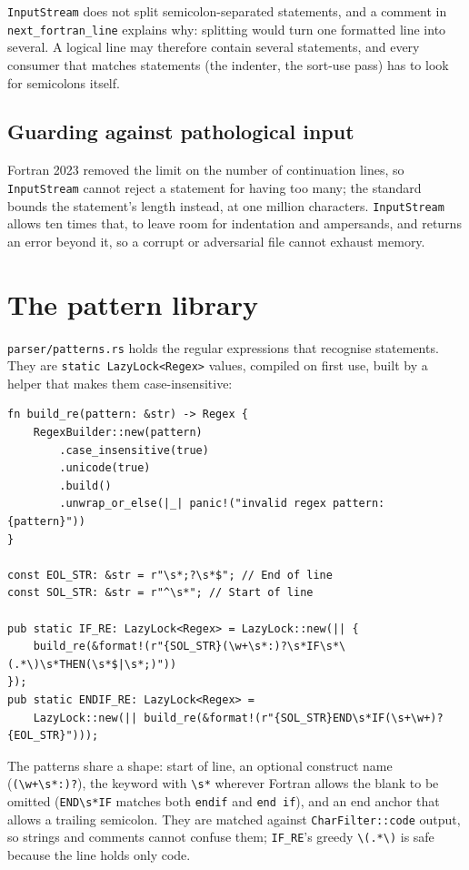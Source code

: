 \documentclass[11pt,a4paper,openany]{book}
\newcommand{\code}[1]{\texttt{\small #1}}
\newcommand{\file}[1]{\texttt{\small\color{accent}#1}}
\begin{document}
\begin{pitfall}
\code{InputStream} does not split semicolon-separated statements, and a
comment in \code{next\_fortran\_line} explains why: splitting would turn one formatted
line into several. A logical line may therefore contain several statements,
and every consumer that matches statements (the indenter, the sort-use pass)
has to look for semicolons itself.
\end{pitfall}

\subsection{Guarding against pathological input}

Fortran 2023 removed the limit on the number of continuation lines, so
\code{InputStream} cannot reject a statement for having too many; the
standard bounds the statement's length instead, at one million characters.
\code{InputStream} allows ten times that, to leave room for indentation and
ampersands, and returns an error beyond it, so a corrupt or adversarial file
cannot exhaust memory.

\section{The pattern library}

\file{parser/patterns.rs} holds the regular expressions that recognise
statements. They are \code{static LazyLock<Regex>} values, compiled on first
use, built by a helper that makes them case-insensitive:

\begin{lstlisting}[style=rust]
fn build_re(pattern: &str) -> Regex {
    RegexBuilder::new(pattern)
        .case_insensitive(true)
        .unicode(true)
        .build()
        .unwrap_or_else(|_| panic!("invalid regex pattern: {pattern}"))
}

const EOL_STR: &str = r"\s*;?\s*$"; // End of line
const SOL_STR: &str = r"^\s*"; // Start of line

pub static IF_RE: LazyLock<Regex> = LazyLock::new(|| {
    build_re(&format!(r"{SOL_STR}(\w+\s*:)?\s*IF\s*\(.*\)\s*THEN(\s*$|\s*;)"))
});
pub static ENDIF_RE: LazyLock<Regex> =
    LazyLock::new(|| build_re(&format!(r"{SOL_STR}END\s*IF(\s+\w+)?{EOL_STR}")));
\end{lstlisting}

The patterns share a shape: start of line, an optional construct name
(\code{(\textbackslash w+\textbackslash s*:)?}), the keyword with
\code{\textbackslash s*} wherever Fortran allows the blank to be omitted
(\code{END\textbackslash s*IF} matches both \code{endif} and \code{end if}),
and an end anchor that allows a trailing semicolon. They are matched against
\code{CharFilter::code} output, so strings and comments cannot confuse them;
\code{IF\_RE}'s greedy \code{\textbackslash(.*\textbackslash)} is safe because
the line holds only code.
\end{document}
